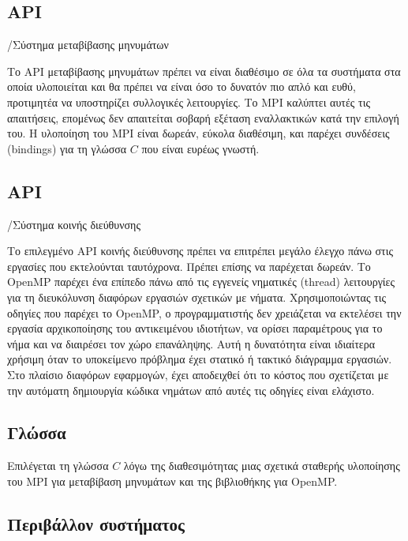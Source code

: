 \documentclass[12pt,a4paper]{article} %
\begin{document}
\subsection{API}/Σύστημα μεταβίβασης μηνυμάτων

Το API μεταβίβασης μηνυμάτων πρέπει να είναι διαθέσιμο σε όλα τα συστήματα στα οποία
υλοποιείται και θα πρέπει να είναι όσο το δυνατόν πιο απλό και ευθύ, προτιμητέα να
υποστηρίζει συλλογικές λειτουργίες. Το MPI καλύπτει αυτές τις απαιτήσεις, επομένως δεν απαιτείται σοβαρή εξέταση εναλλακτικών κατά την επιλογή του. Η υλοποίηση του MPI είναι δωρεάν, εύκολα διαθέσιμη, και παρέχει συνδέσεις (bindings) για τη γλώσσα $C$ που είναι ευρέως γνωστή.
\vspace{0.2cm}


\subsection{API}/Σύστημα κοινής διεύθυνσης

Το επιλεγμένο API κοινής διεύθυνσης πρέπει να επιτρέπει μεγάλο έλεγχο πάνω στις εργασίες
που εκτελούνται ταυτόχρονα. Πρέπει επίσης να παρέχεται δωρεάν. Το OpenMP παρέχει ένα
επίπεδο πάνω από τις εγγενείς νηματικές (thread) λειτουργίες για τη διευκόλυνση
διαφόρων εργασιών σχετικών με νήματα. Χρησιμοποιώντας τις οδηγίες που παρέχει το OpenMP,
ο προγραμματιστής δεν χρειάζεται να εκτελέσει την εργασία αρχικοποίησης του αντικειμένου
ιδιοτήτων, να ορίσει παραμέτρους για το νήμα και να διαιρέσει τον χώρο επανάληψης. Αυτή η
δυνατότητα είναι ιδιαίτερα χρήσιμη όταν το υποκείμενο πρόβλημα έχει στατικό ή τακτικό
διάγραμμα εργασιών. Στο πλαίσιο διαφόρων εφαρμογών, έχει αποδειχθεί ότι το κόστος που
σχετίζεται με την αυτόματη δημιουργία κώδικα νημάτων από αυτές τις οδηγίες είναι
ελάχιστο.
\vspace{0.2cm}

\subsection{Γλώσσα}

Επιλέγεται τη γλώσσα $C$ λόγω της διαθεσιμότητας μιας σχετικά σταθερής υλοποίησης του MPI
για μεταβίβαση μηνυμάτων και της βιβλιοθήκης για OpenMP.
\vspace{0.2cm}

\subsection{Περιβάλλον συστήματος}
\end{document}
